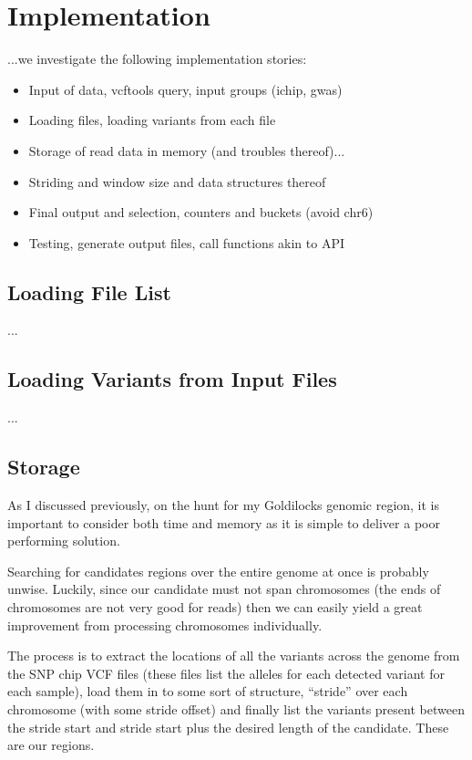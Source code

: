 \section{Implementation}
...we investigate the following implementation stories:

\begin{itemize}
    \item Input of data, vcftools query, input groups (ichip, gwas)
    \item Loading files, loading variants from each file
    \item Storage of read data in memory (and troubles thereof)...
    \item Striding and window size and data structures thereof
    \item Final output and selection, counters and buckets (avoid chr6)
    \item Testing, generate output files, call functions akin to API
\end{itemize}

\subsection{Loading File List}

...


\subsection{Loading Variants from Input Files}

...


\subsection{Storage}

As I discussed previously, on the hunt for my Goldilocks genomic region, it is
important to consider both time and memory as it is simple to deliver a poor
performing solution.

Searching for candidates regions over the entire genome at once is probably
unwise. Luckily, since our candidate must not span chromosomes (the ends of
chromosomes are not very good for reads) then we can easily yield a great
improvement from processing chromosomes individually.

The process is to extract the locations of all the variants across the genome
from the SNP chip VCF files (these files list the alleles for each detected
variant for each sample), load them in to some sort of structure, “stride” over
each chromosome (with some stride offset) and finally list the variants present
between the stride start and stride start plus the desired length of the
candidate. These are our regions.

